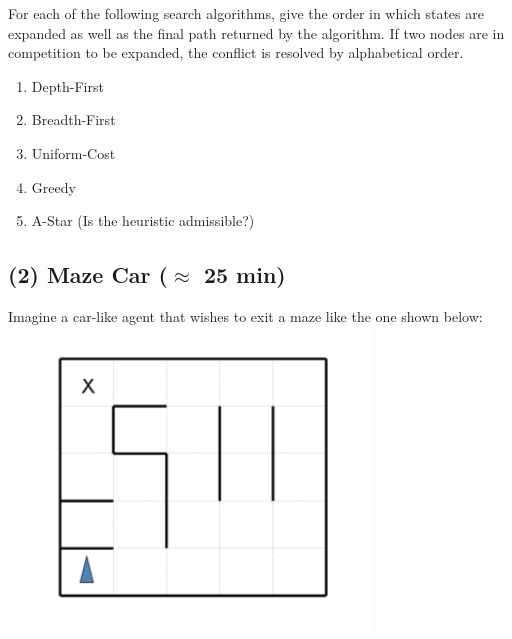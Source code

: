 \documentclass[9pt,a4paper]{extarticle}
\begin{document}
    For each of the following search algorithms, give the order in which states are expanded as well as the final path returned by the algorithm. If two nodes are in competition to be expanded, the conflict is resolved by alphabetical order.

    \begin{enumerate}
        \item Depth-First
        \item Breadth-First
        \item Uniform-Cost
        \item Greedy
        \item A-Star (Is the heuristic admissible?)
    \end{enumerate}

\subsection{(2) Maze Car ($\approx$ 25 min)}
Imagine a car-like agent that wishes to exit a maze like the one shown below:
\\
\includegraphics[scale=1]{figures/tp1_maze.png}
\end{document}
